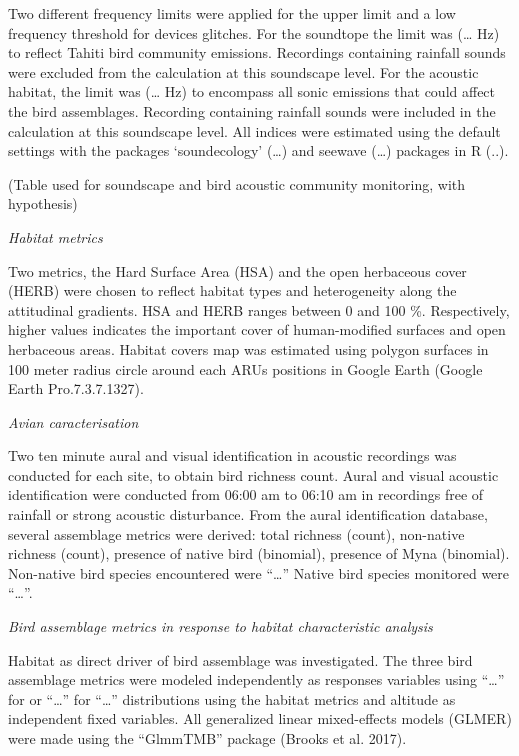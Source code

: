 \documentclass[
  french,
  11pt,
]{stylisharticle}
\begin{document}
Two different frequency limits were applied for the upper limit and a
low frequency threshold for devices glitches. For the soundtope the
limit was (\ldots{} Hz) to reflect Tahiti bird community emissions.
Recordings containing rainfall sounds were excluded from the calculation
at this soundscape level. For the acoustic habitat, the limit was
(\ldots{} Hz) to encompass all sonic emissions that could affect the
bird assemblages. Recording containing rainfall sounds were included in
the calculation at this soundscape level. All indices were estimated
using the default settings with the packages `soundecology' (\ldots) and
seewave (\ldots) packages in R (..).

(Table used for soundscape and bird acoustic community monitoring, with
hypothesis)

\emph{Habitat metrics}

Two metrics, the Hard Surface Area (HSA) and the open herbaceous cover
(HERB) were chosen to reflect habitat types and heterogeneity along the
attitudinal gradients. HSA and HERB ranges between 0 and 100 \%.
Respectively, higher values indicates the important cover of
human-modified surfaces and open herbaceous areas. Habitat covers map
was estimated using polygon surfaces in 100 meter radius circle around
each ARUs positions in Google Earth (Google Earth Pro.7.3.7.1327).

\emph{Avian caracterisation}

Two ten minute aural and visual identification in acoustic recordings
was conducted for each site, to obtain bird richness count. Aural and
visual acoustic identification were conducted from 06:00 am to 06:10 am
in recordings free of rainfall or strong acoustic disturbance. From the
aural identification database, several assemblage metrics were derived:
total richness (count), non-native richness (count), presence of native
bird (binomial), presence of Myna (binomial). Non-native bird species
encountered were \enquote{\ldots{}} Native bird species monitored were
\enquote{\ldots{}}.

\emph{Bird assemblage metrics in response to habitat characteristic
analysis}

Habitat as direct driver of bird assemblage was investigated. The three
bird assemblage metrics were modeled independently as responses
variables using \enquote{\ldots{}} for or \enquote{\ldots{}} for
\enquote{\ldots{}} distributions using the habitat metrics and altitude
as independent fixed variables. All generalized linear mixed-effects
models (GLMER) were made using the \enquote{GlmmTMB} package (Brooks et
al. 2017).
\end{document}
